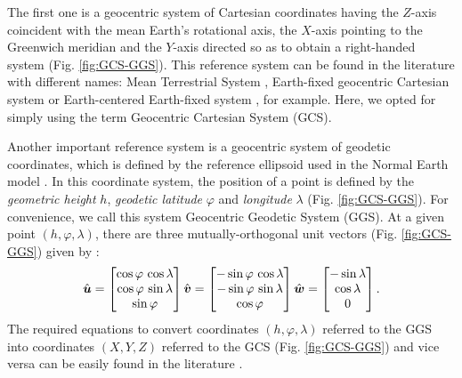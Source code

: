 \documentclass[extra]{gji}
\begin{document}
The first one is a geocentric system of Cartesian coordinates having 
the $Z$-axis coincident with the mean Earth's rotational axis,
the $X$-axis pointing to the Greenwich meridian and the $Y$-axis
directed so as to obtain a right-handed system (Fig. \ref{fig:GCS-GGS}).
This reference system can be found in the literature with different names: Mean Terrestrial System \citep[e.g.,][]{soler1976}, Earth-fixed geocentric Cartesian system \citep[e.g.,][]{torge2012} 
or Earth-centered Earth-fixed system \citep[e.g.,][]{bouman_etal2013}, for example. Here, we opted for simply using the term Geocentric Cartesian System (GCS).

Another important reference system is a geocentric system of 
geodetic coordinates, which is defined by the reference ellipsoid 
used in the Normal Earth model \citep{heiskanen-moritz1967, soler1976, 
torge2012, bouman_etal2013}. 
In this coordinate system, the position of a point 
is defined by the \textit{geometric height} $h$, 
\textit{geodetic latitude} $\varphi$ and \textit{longitude} $\lambda$ (Fig. \ref{fig:GCS-GGS}).
For convenience, we call this system Geocentric Geodetic System
(GGS). 
At a given point $(h, \varphi, \lambda)$, there are three 
mutually-orthogonal unit vectors (Fig. \ref{fig:GCS-GGS}) given by \citep{soler1976}:
\begin{equation}
\hat{\mitbf{u}} = 
\begin{bmatrix}
\cos\varphi \, \cos\lambda \\
\cos\varphi \, \sin\lambda \\
\sin\varphi
\end{bmatrix}
\hat{\mitbf{v}} = 
\begin{bmatrix}
-\sin\varphi \, \cos\lambda \\
-\sin\varphi \, \sin\lambda \\
\cos\varphi
\end{bmatrix}
\hat{\mitbf{w}} = 
\begin{bmatrix}
-\sin\lambda \\
\cos\lambda \\
0
\end{bmatrix} .
\label{eq:unit-vectors}
\end{equation}
The required equations to convert coordinates $(h, \varphi, 
\lambda)$ referred to the GGS into coordinates $(X, Y, Z)$ referred to 
the GCS (Fig. \ref{fig:GCS-GGS}) and vice versa can be easily found in 
the literature \citep[e.g.,][]{heiskanen-moritz1967, torge2012, 
bouman_etal2013}.
\end{document}
